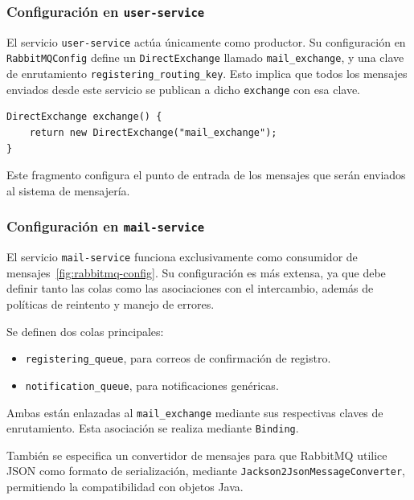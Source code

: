 \subsubsection{Configuración en \texttt{user-service}}

El servicio \texttt{user-service} actúa únicamente como productor. Su configuración en \texttt{RabbitMQConfig} define un \texttt{DirectExchange} llamado \texttt{mail\_exchange}, y una clave de enrutamiento \texttt{registering\_routing\_key}. Esto implica que todos los mensajes enviados desde este servicio se publican a dicho \texttt{exchange} con esa clave.

\begin{verbatim}
DirectExchange exchange() {
    return new DirectExchange("mail_exchange");
}
\end{verbatim}

Este fragmento configura el punto de entrada de los mensajes que serán enviados al sistema de mensajería.

\subsubsection{Configuración en \texttt{mail-service}}

El servicio \texttt{mail-service} funciona exclusivamente como consumidor de mensajes~\ref{fig:rabbitmq-config}. Su configuración es más extensa, ya que debe definir tanto las colas como las asociaciones con el intercambio, además de políticas de reintento y manejo de errores.

Se definen dos colas principales:
\begin{itemize}
  \item \texttt{registering\_queue}, para correos de confirmación de registro.
  \item \texttt{notification\_queue}, para notificaciones genéricas.
\end{itemize}

Ambas están enlazadas al \texttt{mail\_exchange} mediante sus respectivas claves de enrutamiento. Esta asociación se realiza mediante \texttt{Binding}.

También se especifica un convertidor de mensajes para que RabbitMQ utilice JSON como formato de serialización, mediante \texttt{Jackson2JsonMessageConverter}, permitiendo la compatibilidad con objetos Java.

